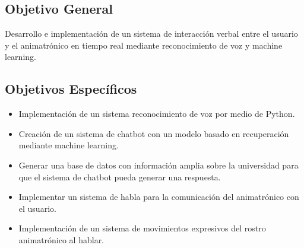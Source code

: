 \subsection*{Objetivo General}
Desarrollo e implementación de un sistema de interacción verbal entre el usuario y el animatrónico en tiempo real mediante reconocimiento de voz y machine learning.

\subsection*{Objetivos Específicos}
\begin{itemize}
\item Implementación de un sistema reconocimiento de voz por medio de Python.
\item Creación de un sistema de chatbot con un modelo basado en recuperación mediante machine learning.
\item Generar una base de datos con información amplia sobre la universidad para que el sistema de chatbot pueda generar una respuesta.
\item Implementar un sistema de habla para la comunicación del animatrónico con el usuario.
\item Implementación de un sistema de movimientos expresivos del rostro animatrónico al hablar.
\end{itemize}